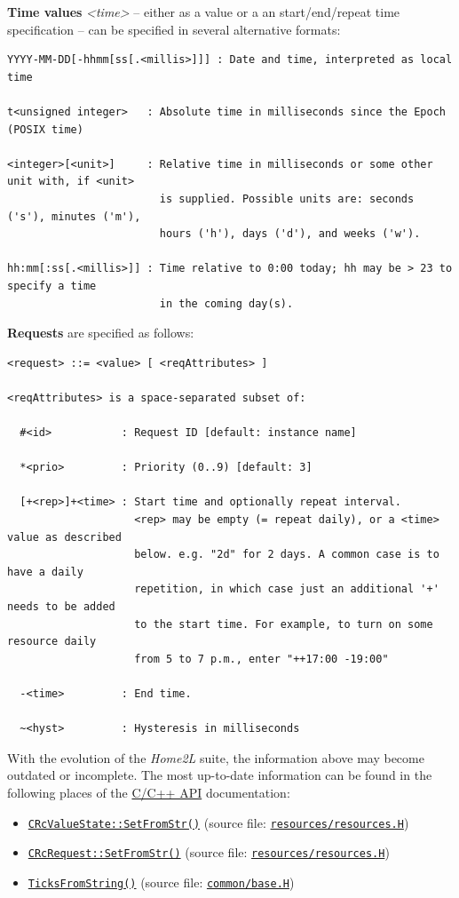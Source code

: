 \documentclass[12pt,english,parskip=half,headheight=19pt]{scrreprt}
\newcommand{\refdoc}[2]{\href{#1}{#2}}              %
\newcommand{\refsrc}[1]{\href{#1}{\texttt{#1}}}     %
\newcommand{\refapic}[1]{\href{home2l-api_c/index.html}{\mbox{\texttt{#1}}}}            %
\newcommand{\theapic}{\refdoc{home2l-api_c/index.html}{C/C++ API}}
\begin{document}
\textbf{Time values} \textit{<time>} -- either as a value or a an start/end/repeat time specification --  can be
specified in several alternative formats:
\begin{lstlisting}
YYYY-MM-DD[-hhmm[ss[.<millis>]]] : Date and time, interpreted as local time

t<unsigned integer>   : Absolute time in milliseconds since the Epoch (POSIX time)

<integer>[<unit>]     : Relative time in milliseconds or some other unit with, if <unit>
                        is supplied. Possible units are: seconds ('s'), minutes ('m'),
                        hours ('h'), days ('d'), and weeks ('w').

hh:mm[:ss[.<millis>]] : Time relative to 0:00 today; hh may be > 23 to specify a time
                        in the coming day(s).
\end{lstlisting}



\textbf{Requests} are specified as follows:
\begin{lstlisting}
<request> ::= <value> [ <reqAttributes> ]

<reqAttributes> is a space-separated subset of:

  #<id>           : Request ID [default: instance name]

  *<prio>         : Priority (0..9) [default: 3]

  [+<rep>]+<time> : Start time and optionally repeat interval.
                    <rep> may be empty (= repeat daily), or a <time> value as described
                    below. e.g. "2d" for 2 days. A common case is to have a daily
                    repetition, in which case just an additional '+' needs to be added
                    to the start time. For example, to turn on some resource daily
                    from 5 to 7 p.m., enter "++17:00 -19:00"

  -<time>         : End time.

  ~<hyst>         : Hysteresis in milliseconds
\end{lstlisting}



With the evolution of the \textit{Home2L} suite, the information above may become outdated or incomplete. The most up-to-date information can be found in the following places of the \theapic{} documentation:

\begin{itemize}
\item
  \refapic{CRcValueState::SetFromStr()} (source file: \refsrc{resources/resources.H})
\item
  \refapic{CRcRequest::SetFromStr()} (source file: \refsrc{resources/resources.H})
\item
  \refapic{TicksFromString()} (source file: \refsrc{common/base.H})
\end{itemize}
\end{document}
